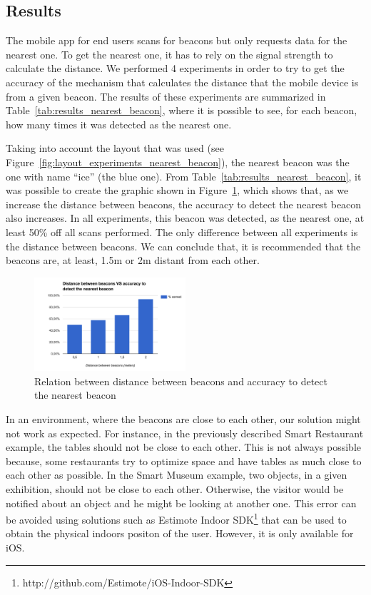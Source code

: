 \subsection{Results}
\label{sub:evaluation_nearest_beacon_results}
The mobile app for end users scans for beacons but only requests data for the nearest one. To get the nearest one, it has to rely on the signal strength to calculate the distance. We performed 4 experiments in order to try to get the accuracy of the mechanism that calculates the distance that the mobile device is from a given beacon.
The results of these experiments are summarized in Table~\ref{tab:results_nearest_beacon}, where it is possible to see, for each beacon, how many times it was detected as the nearest one.

Taking into account the layout that was used (see Figure~\ref{fig:layout_experiments_nearest_beacon}), the nearest beacon was the one with name ``ice'' (the blue one).
From Table~\ref{tab:results_nearest_beacon}, it was possible to create the graphic shown in Figure~\ref{fig:results_experiments_nearest_beacon}, which shows that, as we increase the distance between beacons, the accuracy to detect the nearest beacon also increases.
In all experiments, this beacon was detected, as the nearest one, at least 50\% off all scans performed.
The only difference between all experiments is the distance between beacons.
We can conclude that, it is recommended that the beacons are, at least, 1.5m or 2m distant from each other.



\begin{figure}[!ht]
  \centering
    \includegraphics[width=0.5\textwidth, keepaspectratio]{images/results_nearest_beacon}
    \caption[Distance between beacons vs Accuracy]{Relation between distance between beacons and accuracy to detect the nearest beacon}
    \label{fig:results_experiments_nearest_beacon}
\end{figure}

In an environment, where the beacons are close to each other, our solution might not work as expected.
For instance, in the previously described Smart Restaurant example,
the tables should not be close to each other. This is not always possible because, some restaurants try to optimize space and have tables as much close to each other as possible.
In the Smart Museum example, two objects, in a given exhibition, should not be close to each other.
Otherwise, the visitor would be notified about an object and he might be looking at another one.
This error can be avoided using solutions such as Estimote Indoor \gls{SDK}\footnote{http://github.com/Estimote/iOS-Indoor-SDK} that can be used to obtain the physical indoors positon of the user.
However, it is only available for iOS.


